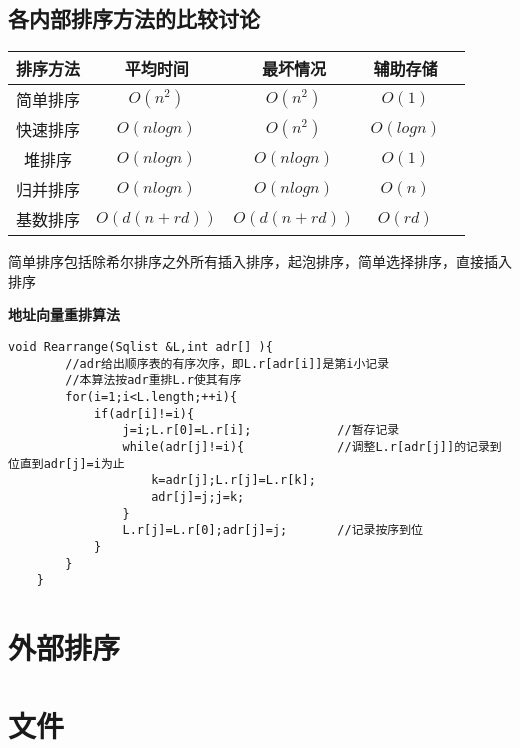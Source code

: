 \documentclass[UTF8]{ctexart}
\newcommand{\mb}[1]{\textbf{#1}}
\begin{document}
\subsection{各内部排序方法的比较讨论}



\begin{tabular}{ccccc}
    \toprule
    排序方法 & 平均时间 & 最坏情况 & 辅助存储   \\
    \midrule
    简单排序 & $O(n^2)$     &  $O(n^2)$ & $O(1)$  \\
    快速排序 & $O(nlogn)$   & $O(n^2)$  & $O(logn)$  \\
    堆排序   & $O(nlogn)$   & $O(nlogn)$  & $O(1)$  \\
    归并排序 & $O(nlogn)$   & $O(nlogn)$  & $O(n)$  \\
    基数排序 & $O(d(n+rd))$ & $O(d(n+rd))$  & $O(rd)$  \\
    \bottomrule
\end{tabular}%
 

简单排序包括除希尔排序之外所有插入排序，起泡排序，简单选择排序，直接插入排序

\mb{地址向量重排算法}

\begin{lstlisting}[style=v1]
    void Rearrange(Sqlist &L,int adr[] ){
        //adr给出顺序表的有序次序，即L.r[adr[i]]是第i小记录
        //本算法按adr重排L.r使其有序
        for(i=1;i<L.length;++i){
            if(adr[i]!=i){
                j=i;L.r[0]=L.r[i];            //暂存记录  
                while(adr[j]!=i){             //调整L.r[adr[j]]的记录到位直到adr[j]=i为止  
                    k=adr[j];L.r[j]=L.r[k];     
                    adr[j]=j;j=k;
                }
                L.r[j]=L.r[0];adr[j]=j;       //记录按序到位 
            }
        }
    }
\end{lstlisting}


\newpage
\section{外部排序}
\newpage
\section{文件}










 
\end{document}
